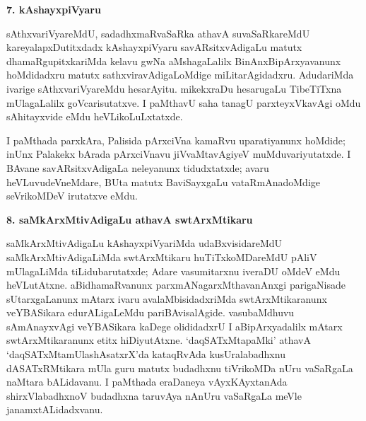 \begin{center}
{\textbf{\Large 7. kAshayxpiVyaru}}
\end{center}

sAthxvariVyareMdU, sadadhxmaRvaSaRka athavA suvaSaRkareMdU kareyalapxDutitxdadx kAshayxpiVyaru savARsitxvAdigaLu matutx dhamaRgupitxkariMda kelavu gwNa aMshagaLalilx BinAnxBipArxyavanunx hoMdidadxru matutx sathxviravAdigaLoMdige miLitarAgidadxru. AdudariMda ivarige sAthxvariVyareMdu hesarAyitu. mikekxraDu hesarugaLu TibeTiTxna mUlagaLalilx goVcarisutatxve. I paMthavU saha tanagU parxteyxVkavAgi oMdu sAhitayxvide eMdu heVLikoLuLxtatxde.

I paMthada parxkAra, Palisida pArxciVna kamaRvu uparatiyanunx hoMdide; inUnx Palakekx bArada pArxciVnavu jiVvaMtavAgiyeV muMduvariyutatxde. I BAvane savARsitxvAdigaLa neleyanunx tidudxtatxde; avaru heVLuvudeVneMdare, BUta matutx BaviSayxgaLu vataRmAnadoMdige seVrikoMDeV irutatxve eMdu.

\begin{center}
{\textbf{\Large 8. saMkArxMtivAdigaLu athavA swtArxMtikaru}}
\end{center}

saMkArxMtivAdigaLu kAshayxpiVyariMda udaBxvisidareMdU saMkArxMtivAdigaLiMda swtArxMtikaru huTiTxkoMDareMdU pAliV mUlagaLiMda tiLidubarutatxde; Adare vasu\-mitarxnu iveraDU oMdeV eMdu heVLutAtxne. aBidhamaRvanunx parxmANagarxMtha\-vanAnxgi parigaNisade sUtarxgaLanunx mAtarx ivaru avalaMbisidadxriMda swtArxMtikaranunx veYBASikara edurALigaLeMdu pariBAvisalAgide. vasubaMdhuvu sAmAnayxvAgi veYBASikara kaDege olididadxrU I aBipArxyadalilx mAtarx swtArxMtikaranunx etitx hiDiyutAtxne. `daqSATxMta\-paMki' athavA `daqSATxMtamUlashAsatxrX'da kataqRvAda kusUralabadhxnu dASATxRMtikara mUla guru matutx budadhxnu tiVrikoMDa nUru vaSaRgaLa naMtara bALidavanu. I paMthada eraDaneya vAyxKAyxtanAda shirxVlabadhxnoV budadhxna taruvAya nAnUru vaSaR\-gaLa meVle janamxtALidadxvanu.

